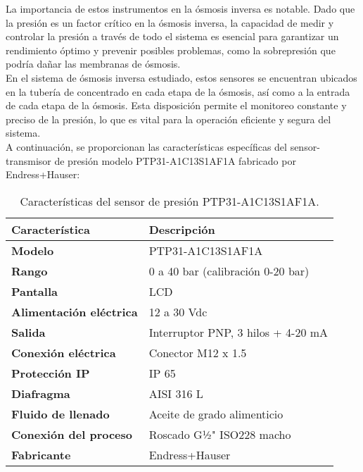 La importancia de estos instrumentos en la ósmosis inversa es notable. Dado que la presión es un factor
crítico en la ósmosis inversa, la capacidad de medir y controlar la presión a través de todo el sistema
es esencial para garantizar un rendimiento óptimo y prevenir posibles problemas, como la sobrepresión
que podría dañar las membranas de ósmosis.\\

En el sistema de ósmosis inversa estudiado, estos sensores se encuentran
ubicados en la tubería de concentrado en cada etapa de la ósmosis, así como a la entrada de cada etapa
de la ósmosis. Esta disposición permite el monitoreo constante y preciso de la presión, lo que es
vital para la operación eficiente y segura del sistema.\\

A continuación, se proporcionan las características específicas del sensor-transmisor de presión
modelo PTP31-A1C13S1AF1A fabricado por Endress+Hauser:\\



\begin{table}[H]
    \centering
    \caption{Características del sensor de presión PTP31-A1C13S1AF1A. }
    \label{table:sensor_transmisor_presion}
    \begin{tabular}{| L{6cm} | L{6cm} |}
        \hline
        \textbf{Característica}         & \textbf{Descripción}               \\
        \hline
        \textbf{Modelo}                 & PTP31-A1C13S1AF1A                  \\
        \hline
        \textbf{Rango}                  & 0 a 40 bar (calibración 0-20 bar)  \\
        \hline
        \textbf{Pantalla}               & LCD                                \\
        \hline
        \textbf{Alimentación eléctrica} & 12 a 30 Vdc                        \\
        \hline
        \textbf{Salida}                 & Interruptor PNP, 3 hilos + 4-20 mA \\
        \hline
        \textbf{Conexión eléctrica}     & Conector M12 x 1.5                 \\
        \hline
        \textbf{Protección IP}          & IP 65                              \\
        \hline
        \textbf{Diafragma}              & AISI 316 L                         \\
        \hline
        \textbf{Fluido de llenado}      & Aceite de grado alimenticio        \\
        \hline
        \textbf{Conexión del proceso}   & Roscado G½" ISO228 macho           \\
        \hline
        \textbf{Fabricante}             & Endress+Hauser                     \\
        \hline
    \end{tabular}
\end{table}

